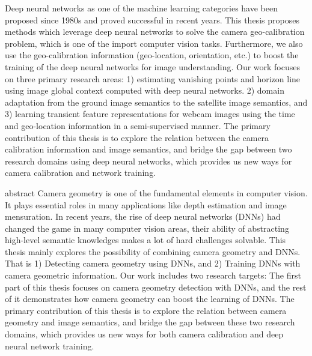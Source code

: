 Deep neural networks as one of the machine learning categories have been proposed
since 1980s and proved successful in recent years. This thesis proposes methods which
leverage deep neural networks to solve the camera geo-calibration problem, which is
one of the import computer vision tasks. Furthermore, we also use the geo-calibration
information (geo-location, orientation, etc.) to boost the training of the deep neural
networks for image understanding.
Our work focuses on three primary research areas: 1) estimating vanishing points
and horizon line using image global context computed with deep neural networks. 2)
domain adaptation from the ground image semantics to the satellite image semantics,
and 3) learning transient feature representations for webcam images using the time
and geo-location information in a semi-supervised manner.
The primary contribution of this thesis is to explore the relation between the
camera calibration information and image semantics, and bridge the gap between
two research domains using deep neural networks, which provides us new ways for
camera calibration and network training.


abstract
Camera geometry is one of the fundamental elements in computer vision.
It plays essential roles in many applications like depth estimation
and image mensuration.
%
In recent years, the rise of deep neural networks (DNNs) had changed
the game in many computer vision areas, their ability of abstracting
high-level semantic knowledges makes a lot of hard challenges
solvable.
%
This thesis mainly explores the possibility of combining camera
geometry and DNNs. That is 1) Detecting camera geometry using DNNs,
and 2) Training DNNs with camera geometric information.  Our work
includes two research targets: The first part of this thesis focuses
on camera geometry detection with DNNs, and the rest of it
demonstrates how camera geometry can boost the learning of DNNs.
%
The primary contribution of this thesis is to explore the relation
between camera geometry and image semantics, and bridge the gap
between these two research domains, which provides us new ways for
both camera calibration and deep neural network training.
